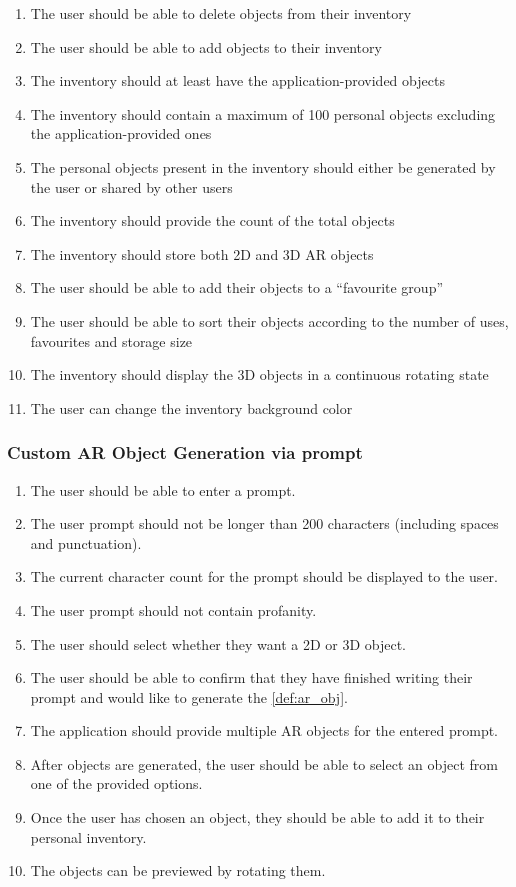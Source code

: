 \documentclass{article}
\begin{document}
\begin{enumerate}[align=left, label=\textbf{IV-FR\arabic*:}]
    \item The user should be able to delete objects from their inventory
    \item The user should be able to add objects to their inventory
    \item The inventory should at least have the application-provided objects
    \item The inventory should contain a maximum of 100 personal objects excluding the application-provided ones
    \item The personal objects present in the inventory should either be generated by the user or shared by other users
    \item The inventory should provide the count of the total objects
    \item The inventory should store both 2D and 3D AR objects
    \item The user should be able to add their objects to a “favourite group”
    \item The user should be able to sort their objects according to the number of uses, favourites and storage size
    \item The inventory should display the 3D objects in a continuous rotating state
    \item The user can change the inventory background color
\end{enumerate}

\subsubsection{Custom AR Object Generation via prompt}
\label{ssub:prompt_obj_gen}

\begin{enumerate}[align=left, label=\textbf{POG-FR\arabic*:}]
    \item The user should be able to enter a prompt.
    \item The user prompt should not be longer than 200 characters (including spaces and punctuation).
    \item The current character count for the prompt should be displayed to the user.
    \item The user prompt should not contain profanity.
    \item The user should select whether they want a 2D or 3D object.
    \item The user should be able to confirm that they have finished writing their prompt and would like to generate the \ref{def:ar_obj}.
    \item The application should provide multiple AR objects for the entered prompt.
    \item After objects are generated, the user should be able to select an object from one of the provided options.
    \item Once the user has chosen an object, they should be able to add it to their personal inventory.
    \item The objects can be previewed by rotating them.
\end{enumerate}
\end{document}
